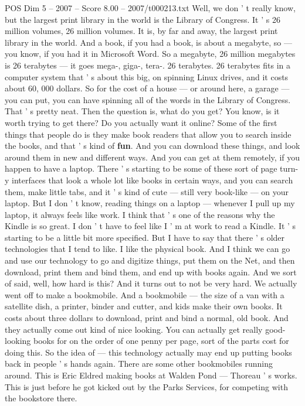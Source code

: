 \begin{textsample}{POS Dim 5 – 2007 – Score 8.00 – 2007/t000213.txt}
Well, we don ' t really know, but the largest print library in the world is the Library of Congress.
It ' s 26 million volumes, 26 million volumes.
It is, by far and away, the largest print library in the world.
And a book, if you had a book, is about a megabyte, so — you know, if you had it in Microsoft Word.
So a megabyte, 26 million megabytes is 26 terabytes — it goes mega-, giga-, tera-. 26 terabytes. 26 terabytes fits in a computer system that ' s about this big, on spinning Linux drives, and it costs about 60, 000 dollars.
So for the cost of a house — or around here, a garage — you can put, you can have spinning all of the words in the Library of Congress.
That ' s pretty neat.
Then the question is, what do you get?
You know, is it worth trying to get there?
Do you actually want it online?
Some of the first things that people do is they make book readers that allow you to search inside the books, and that ' s kind of \textbf{fun}.
And you can download these things, and look around them in new and different ways.
And you can get at them remotely, if you happen to have a laptop.
There ' s starting to be some of these sort of page turn-y interfaces that look a whole lot like books in certain ways, and you can search them, make little tabs, and it ' s kind of cute — still very book-like — on your laptop.
But I don ' t know, reading things on a laptop — whenever I pull up my laptop, it always feels like work.
I think that ' s one of the reasons why the Kindle is so great.
I don ' t have to feel like I ' m at work to read a Kindle.
It ' s starting to be a little bit more specified.
But I have to say that there ' s older technologies that I tend to like.
I like the physical book.
And I think we can go and use our technology to go and digitize things, put them on the Net, and then download, print them and bind them, and end up with books again.
And we sort of said, well, how hard is this?
And it turns out to not be very hard.
We actually went off to make a bookmobile.
And a bookmobile — the size of a van with a satellite dish, a printer, binder and cutter, and kids make their own books.
It costs about three dollars to download, print and bind a normal, old book.
And they actually come out kind of nice looking.
You can actually get really good-looking books for on the order of one penny per page, sort of the parts cost for doing this.
So the idea of — this technology actually may end up putting books back in people ' s hands again.
There are some other bookmobiles running around.
This is Eric Eldred making books at Walden Pond — Thoreau ' s works.
This is just before he got kicked out by the Parks Services, for competing with the bookstore there.

\end{textsample}
